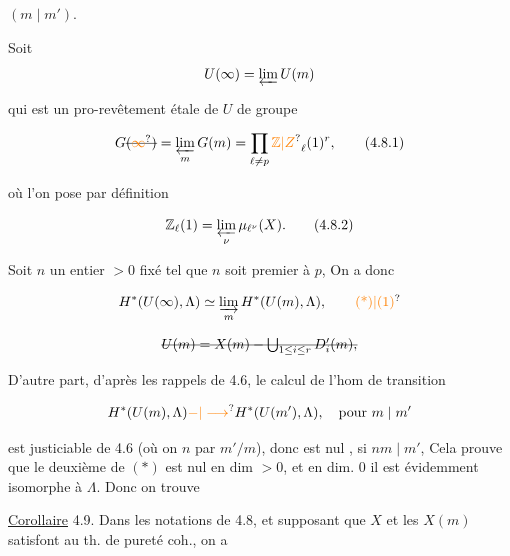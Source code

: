  $(m\mid m')$.

Soit 
\[
U(\infty)=\varprojlim U(m)
\]

qui est un  pro-revêtement étale de $U$ de groupe

\[
G\deleted{(\unsure{\infty})}=\varprojlim_m G(m)=\prod_{\ell\ne p}\unsure{\mathbb{Z}|Z}_\ell(1)^r,
\tag*{(4.8.1)}
\]

 où l'on pose par définition

\[
\mathbb{Z}_\ell(1)=\varprojlim_\nu\mu_{\ell^\nu}(X).
\tag*{(4.8.2)}
\]

Soit $n$ un entier $>0$ fixé tel que $n$ soit premier à $p$,  On a donc

\[
H^*(U(\infty),\Lambda)\simeq\varinjlim_m H^*(U(m),\Lambda),
\tag*{\unsure{(*)|(1)}}
\]

\[
\deleted{U(m)=X(m)-\bigcup_{1\leq i\leq r}D'_i(m),}
\]

D'autre part, d'après les rappels de 4.6, le calcul de l'hom de transition


\[
H^*(U(m),\Lambda)\unsure{{-}|\longrightarrow}H^*(U(m'),\Lambda),\quad\text{pour }m\mid m'
\]

est justiciable de 4.6 (où on  $n$ par $m'/m$), donc est nul , si $nm\mid m'$,   Cela prouve que le deuxième  de $(*)$ est nul en dim $>0$, et en dim. 0 il est évidemment isomorphe à $\Lambda$. Donc on trouve

\uline{Corollaire} 4.9. Dans les notations de 4.8, et supposant que $X$ et les $X(m)$ satisfont au th. de pureté coh.,  on a


